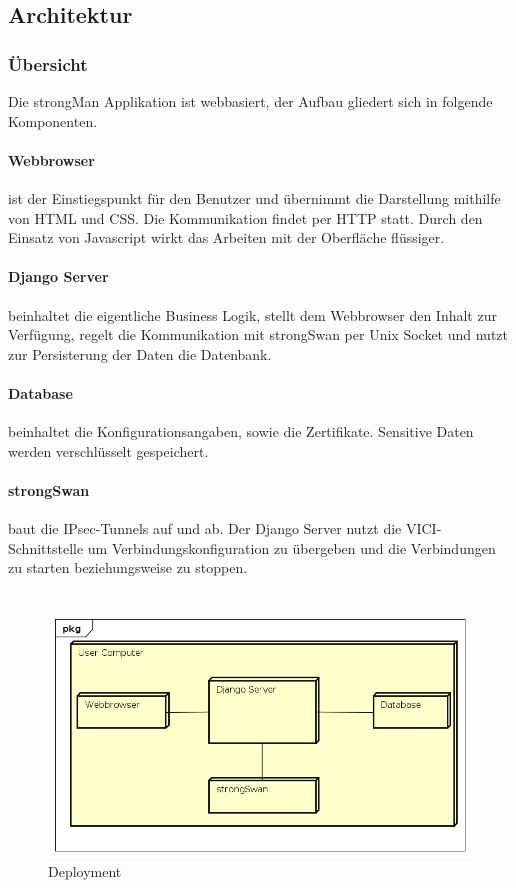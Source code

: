 \subsection{Architektur}

\subsubsection{Übersicht}
Die strongMan Applikation ist webbasiert, der Aufbau gliedert sich in folgende Komponenten.

\paragraph{Webbrowser} ist der Einstiegspunkt für den Benutzer und übernimmt die Darstellung mithilfe von HTML und CSS. Die Kommunikation findet per HTTP statt. Durch den Einsatz von Javascript wirkt das Arbeiten mit der Oberfläche flüssiger.

\paragraph{Django Server} beinhaltet die eigentliche Business Logik,  stellt dem Webbrowser den Inhalt zur Verfügung, regelt die Kommunikation mit strongSwan per Unix Socket und nutzt zur Persisterung der Daten die Datenbank.

\paragraph{Database} beinhaltet die Konfigurationsangaben, sowie die Zertifikate. Sensitive Daten werden verschlüsselt gespeichert.

\paragraph{strongSwan} baut die IPsec-Tunnels auf und ab. Der Django Server nutzt die VICI-Schnittstelle um Verbindungskonfiguration zu übergeben und die Verbindungen zu starten beziehungsweise zu stoppen. \\\\


\begin{figure}[H]
\centering
\includegraphics[width=360pt]{images/deployment.png}
\caption[Deployment]{Deployment}
\end{figure}

